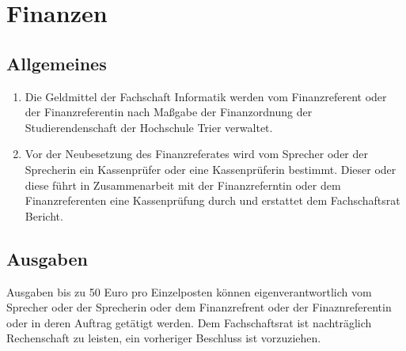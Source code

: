\section{Finanzen}
\subsection{Allgemeines}
\begin{enumerate}
\item Die Geldmittel der Fachschaft Informatik werden vom Finanzreferent oder der Finanzreferentin nach Maßgabe der Finanzordnung der Studierendenschaft der Hochschule Trier verwaltet.
\item Vor der Neubesetzung des Finanzreferates wird vom Sprecher oder der Sprecherin ein Kassenprüfer oder eine Kassenprüferin bestimmt. Dieser oder diese führt in Zusammenarbeit mit der Finanzreferntin oder dem Finanzreferenten eine Kassenprüfung durch und erstattet dem Fachschaftsrat Bericht.
\end{enumerate}

\subsection{Ausgaben}
Ausgaben bis zu 50 Euro pro Einzelposten können eigenverantwortlich vom Sprecher oder der Sprecherin oder dem Finanzrefrent oder der Finaznreferentin oder in deren Auftrag getätigt werden. Dem Fachschaftsrat ist nachträglich Rechenschaft zu leisten, ein vorheriger Beschluss ist vorzuziehen.
